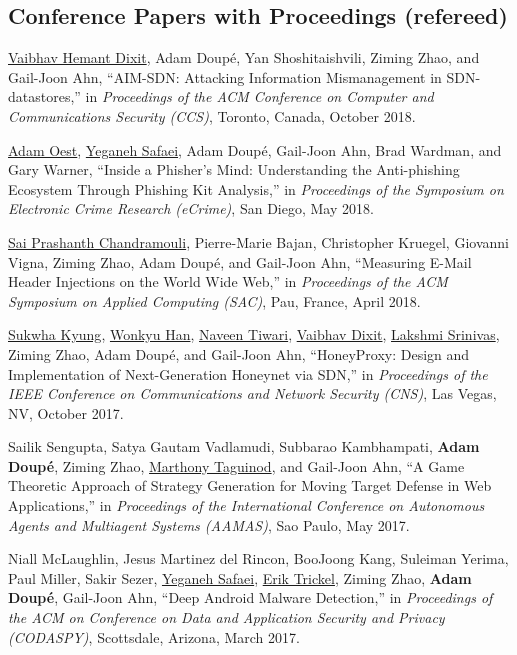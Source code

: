 \documentclass[11pt,letterpaper,sans]{moderncv}
\begin{document}
\subsection{Conference Papers with Proceedings (refereed)}

\begin{etaremune}

\item \underline{Vaibhav Hemant Dixit}, Adam Doup\'e, Yan
  Shoshitaishvili, Ziming Zhao, and Gail-Joon Ahn, ``AIM-SDN:
  Attacking Information Mismanagement in SDN-datastores,'' in
  \emph{Proceedings of the ACM Conference on Computer and
    Communications Security (CCS)}, Toronto, Canada, October 2018.

\item \underline{Adam Oest}, \underline{Yeganeh Safaei}, Adam Doup\'e,
  Gail-Joon Ahn, Brad Wardman, and Gary Warner, ``Inside a Phisher's
  Mind: Understanding the Anti-phishing Ecosystem Through Phishing Kit
  Analysis,'' in \emph{Proceedings of the Symposium on Electronic
    Crime Research (eCrime)}, San Diego, May 2018. 
  
\item \underline{Sai Prashanth Chandramouli}, Pierre-Marie Bajan,
  Christopher Kruegel, Giovanni Vigna, Ziming Zhao, Adam Doup\'e, and
  Gail-Joon Ahn, ``Measuring E-Mail Header Injections on the World
  Wide Web,'' in \emph{Proceedings of the ACM Symposium on Applied
    Computing (SAC)}, Pau, France, April 2018.

\item \underline{Sukwha Kyung}, \underline{Wonkyu Han},
  \underline{Naveen Tiwari}, \underline{Vaibhav Dixit},
  \underline{Lakshmi Srinivas}, Ziming Zhao, Adam Doup\'e, and
  Gail-Joon Ahn, ``HoneyProxy: Design and Implementation of
  Next-Generation Honeynet via SDN,'' in \emph{Proceedings of the IEEE
    Conference on Communications and Network Security (CNS)}, Las
  Vegas, NV, October 2017. 

\item Sailik Sengupta, Satya Gautam Vadlamudi, Subbarao Kambhampati,
  \textbf{Adam Doup\'e}, Ziming Zhao, \underline{Marthony Taguinod},
  and Gail-Joon Ahn, ``A Game Theoretic Approach of Strategy
  Generation for Moving Target Defense in Web Applications,'' in
  \emph{Proceedings of the International Conference on Autonomous Agents
    and Multiagent Systems (AAMAS)}, Sao Paulo, May 2017.

\item Niall McLaughlin, Jesus Martinez del Rincon, BooJoong Kang,
  Suleiman Yerima, Paul Miller, Sakir Sezer, \underline{Yeganeh
    Safaei}, \underline{Erik Trickel}, Ziming Zhao, \textbf{Adam
    Doup\'e}, Gail-Joon Ahn, ``Deep Android Malware Detection,'' in
  \emph{Proceedings of the ACM on Conference on Data and Application
    Security and Privacy (CODASPY)}, Scottsdale, Arizona, March 2017.


\end{etaremune}
\end{document}
